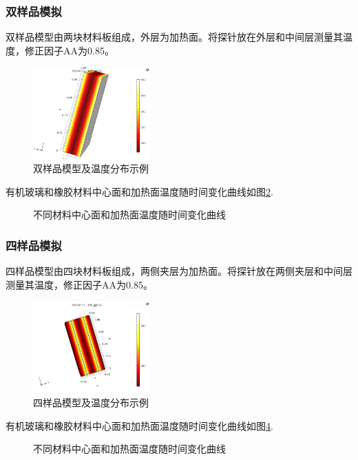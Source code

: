 \documentclass[10pt,a4paper,twoside,UTF8]{ctexart}
\begin{document}
\subsubsection{双样品模拟}
双样品模型由两块材料板组成，外层为加热面。将探针放在外层和中间层测量其温度，修正因子AA为0.85。
\begin{figure}[H]
	\centering
	\includegraphics[width=0.4\textwidth]{C8.3/Mod1 glass/b.png}
	\caption{双样品模型及温度分布示例}
	\label{fig: 2}
\end{figure}

有机玻璃和橡胶材料中心面和加热面温度随时间变化曲线如图\ref{fig: Mod1}.
\begin{figure}[H]
	\centering
	\caption{不同材料中心面和加热面温度随时间变化曲线}
	\label{fig: Mod1}
\end{figure}

\subsubsection{四样品模拟}
四样品模型由四块材料板组成，两侧夹层为加热面。将探针放在两侧夹层和中间层测量其温度，修正因子AA为0.85。
\begin{figure}[H]
	\centering
	\includegraphics[width=0.4\textwidth]{C8.3/Mod2 rubber/b.png}
	\caption{四样品模型及温度分布示例}
	\label{fig: 4}
\end{figure}

有机玻璃和橡胶材料中心面和加热面温度随时间变化曲线如图\ref{fig: Mod2}.
\begin{figure}[H]
	\centering
	\caption{不同材料中心面和加热面温度随时间变化曲线}
	\label{fig: Mod2}
\end{figure}
\end{document}
